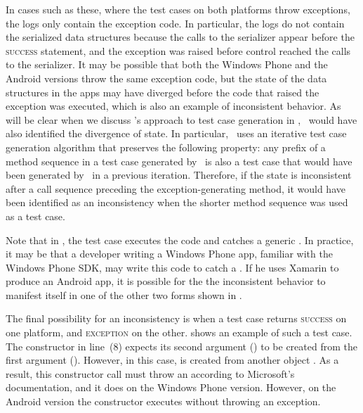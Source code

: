 In cases such as these, where the test cases on both platforms throw
exceptions, the logs only contain the exception code. In particular, the logs
do not contain the serialized data structures because the calls to the
serializer appear before the  \textsc{success} statement, and the
exception was raised before control reached the calls to the serializer.  It
may be possible that both the Windows Phone and the Android versions throw the
same exception code, but the state of the data structures in the apps may have
diverged before the code that raised the exception was executed, which is also
an example of inconsistent behavior. As will be clear when we discuss \tool's
approach to test case generation in , \tool\ would have
also identified the divergence of state. In particular, \tool\ uses an
iterative test case generation algorithm that preserves the following property:
any prefix of a method sequence in a test case generated by \tool\ is also a
test case that would have been generated by \tool\ in a previous iteration.
Therefore, if the state is inconsistent after a call sequence preceding the
exception-generating method, it would have been identified as an inconsistency
when the shorter method sequence was used as a test case.

Note that in , the test case executes the code and
catches a generic . In practice, it may be that a
developer writing a Windows Phone app, familiar with the Windows Phone SDK, may
write this code to catch a . If he
uses Xamarin to produce an Android app, it is possible for the the inconsistent
behavior to manifest itself in one of the other two forms shown in
.


The final possibility for an inconsistency is when a test case returns
\textsc{success} on one platform, and \textsc{exception} on the other.
 shows an example of such a test case. The
 constructor in line~(8) expects its second argument
() to be created from the first argument (). However, in
this case,  is created from another object . As a result,
this constructor call must throw an  according to
Microsoft's documentation, and it does on the Windows Phone version. However,
on the Android version the constructor executes without throwing an exception.

